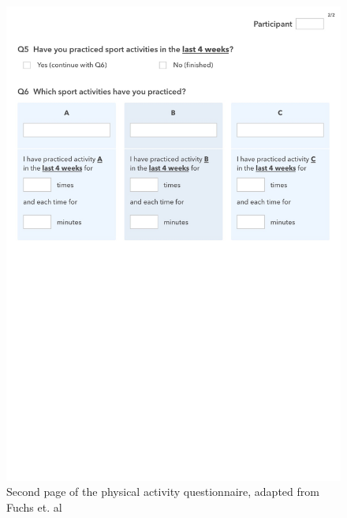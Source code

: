 \begin{appendices}
\begin{figure}[htb]
	\centering
	\begin{minipage}[t]{0.82\linewidth}
		\centering
		\includegraphics[width=1\linewidth]{Pictures/App_BSA2}
		\caption{Second page of the physical activity questionnaire, adapted from Fuchs et. al~\cite{Fuchs2015-bsa}}
		\label{fig:App_DemographicDataHTG}
	\end{minipage}
\end{figure}

\clearpage


\end{appendices}
